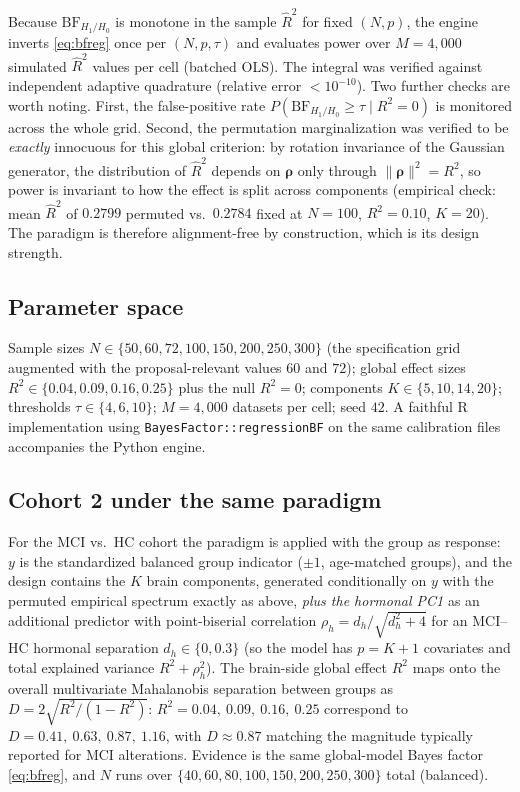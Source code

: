\documentclass[11pt,a4paper]{article}
\newcommand{\BF}{\mathrm{BF}}
\begin{document}
Because $\BF_{H_1/H_0}$ is monotone in the sample $\hat R^{2}$ for fixed $(N,p)$, the engine inverts \eqref{eq:bfreg} once per $(N,p,\tau)$ and evaluates power over $M=4{,}000$ simulated $\hat R^{2}$ values per cell (batched OLS). The integral was verified against independent adaptive quadrature (relative error $<10^{-10}$). Two further checks are worth noting. First, the false-positive rate $P(\BF_{H_1/H_0}\ge\tau\mid R^{2}=0)$ is monitored across the whole grid. Second, the permutation marginalization was verified to be \emph{exactly} innocuous for this global criterion: by rotation invariance of the Gaussian generator, the distribution of $\hat R^{2}$ depends on $\bm\rho$ only through $\lVert\bm\rho\rVert^{2}=R^{2}$, so power is invariant to how the effect is split across components (empirical check: mean $\hat R^{2}$ of $0.2799$ permuted vs.\ $0.2784$ fixed at $N=100$, $R^{2}=0.10$, $K=20$). The paradigm is therefore alignment-free by construction, which is its design strength.

\subsection{Parameter space}

Sample sizes $N\in\{50,60,72,100,150,200,250,300\}$ (the specification grid augmented with the proposal-relevant values $60$ and $72$); global effect sizes $R^{2}\in\{0.04,0.09,0.16,0.25\}$ plus the null $R^{2}=0$; components $K\in\{5,10,14,20\}$; thresholds $\tau\in\{4,6,10\}$; $M=4{,}000$ datasets per cell; seed $42$. A faithful R implementation using \texttt{BayesFactor::regressionBF} on the same calibration files accompanies the Python engine.

\subsection{Cohort 2 under the same paradigm}

For the MCI vs.\ HC cohort the paradigm is applied with the group as response: $y$ is the standardized balanced group indicator ($\pm1$, age-matched groups), and the design contains the $K$ brain components, generated conditionally on $y$ with the permuted empirical spectrum exactly as above, \emph{plus the hormonal PC1} as an additional predictor with point-biserial correlation $\rho_h=d_h/\sqrt{d_h^{2}+4}$ for an MCI--HC hormonal separation $d_h\in\{0,0.3\}$ (so the model has $p=K+1$ covariates and total explained variance $R^{2}+\rho_h^{2}$). The brain-side global effect $R^{2}$ maps onto the overall multivariate Mahalanobis separation between groups as $D=2\sqrt{R^{2}/(1-R^{2})}$: $R^{2}=0.04,\ 0.09,\ 0.16,\ 0.25$ correspond to $D=0.41,\ 0.63,\ 0.87,\ 1.16$, with $D\approx0.87$ matching the magnitude typically reported for MCI alterations. Evidence is the same global-model Bayes factor \eqref{eq:bfreg}, and $N$ runs over $\{40,60,80,100,150,200,250,300\}$ total (balanced).
\end{document}
